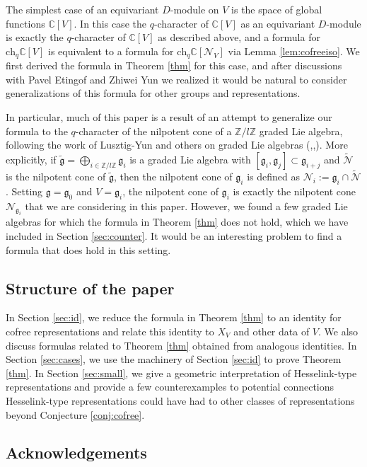 \documentclass[12pt]{article}
\newcommand{\Z}{\mathbb{Z}}
\newcommand{\C}{\mathbb{C}}
\theoremstyle{definition}
\theoremstyle{remark}
\newcommand{\g}{\mathfrak{g}}
\newcommand{\ch}{\mathrm{ch}}
\newcommand{\N}{\mathcal{N}}
\begin{document}
The simplest case of an equivariant $D$-module on $V$ is the space of global functions $\C[V]$. In this case the $q$-character of $\C[V]$ as an equivariant $D$-module is exactly the $q$-character of $\C[V]$ as described above, and a formula for $\ch_q\C[V]$ is equivalent to a formula for $\ch_q\C[\N_V]$ via Lemma \ref{lem:cofreeiso}. We first derived the formula in Theorem \ref{thm} for this case, and after discussions with Pavel Etingof and Zhiwei Yun we realized it would be natural to consider generalizations of this formula for other groups and representations. 

In particular, much of this paper is a result of an attempt to generalize our formula to the $q$-character of the nilpotent cone of a $\Z/l\Z$ graded Lie algebra, following the work of Lusztig-Yun and others on graded Lie algebras (\cite{wille},\cite{LUSZTIG1995147},\cite{lusztigyun}). More explicitly, if $\tilde{\g}=\bigoplus_{i\in\Z/l\Z}\g_i$ is a graded Lie algebra with $[\g_i,\g_j]\subset\g_{i+j}$ and $\tilde{\N}$ is the nilpotent cone of $\tilde{\g}$, then the nilpotent cone of $\g_i$ is defined as $\N_i:=\g_i\cap\tilde{\N}$. Setting $\g=\g_0$ and $V=\g_i$, the nilpotent cone of $\g_i$ is exactly the nilpotent cone $\N_{\g_i}$ that we are considering in this paper. However, we found a few graded Lie algebras for which the formula in Theorem \ref{thm} does not hold, which we have included in Section \ref{sec:counter}. It would be an interesting problem to find a formula that does hold in this setting. 

\subsection{Structure of the paper}

In Section \ref{sec:id}, we reduce the formula in Theorem \ref{thm} to an identity for cofree representations and relate this identity to $X_V$ and other data of $V$. We also discuss formulas related to Theorem \ref{thm} obtained from analogous identities. In Section \ref{sec:cases}, we use the machinery of Section \ref{sec:id} to prove Theorem \ref{thm}. In Section \ref{sec:small}, we give a geometric interpretation of Hesselink-type representations and provide a few counterexamples to potential connections Hesselink-type representations could have had to other classes of representations beyond Conjecture \ref{conj:cofree}.

\subsection*{Acknowledgements}
\end{document}
